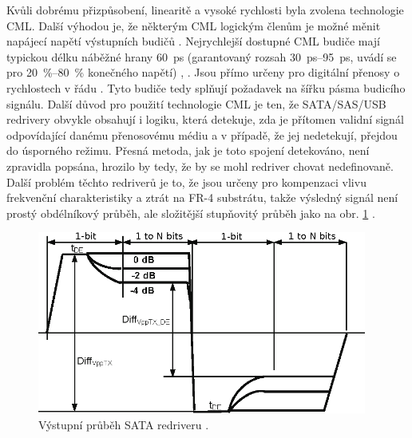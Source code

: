 Kvůli dobrému přizpůsobení, linearitě a vysoké rychlosti byla zvolena technologie \acrshort{CML}. Další výhodou je, že některým \acrshort{CML} logickým členům je možné měnit napájecí napětí výstupních budičů \cite{SY54020datasheet}. Nejrychlejší dostupné \acrshort{CML} budiče mají typickou délku náběžné hrany \SI{60}{\pico\second} (garantovaný rozsah \mbox{\SIrange{30}{95}{\ps}}, uvádí se pro \mbox{\SIrange{20}{80}{\%}} konečného napětí) \cite{SY54020datasheet}, \cite{SY54017datasheet}. Jsou přímo určeny pro digitální přenosy o rychlostech v řádu \si{\gigabitpersecond}. Tyto budiče tedy splňují požadavek na šířku pásma budicího signálu.
Další důvod pro použití technologie \acrshort{CML} je ten, že \acrshort{SATA}/\acrshort{SAS}/\acrshort{USB} redrivery obvykle obsahují i logiku, která detekuje, zda je přítomen validní signál odpovídající danému přenosovému médiu a v případě, že jej nedetekují, přejdou do úsporného režimu. Přesná metoda, jak je toto spojení detekováno, není zpravidla popsána, hrozilo by tedy, že by se mohl redriver chovat nedefinovaně. Další problém těchto redriverů je to, že jsou určeny pro kompenzaci vlivu frekvenční charakteristiky a ztrát na FR-4 substrátu, takže výsledný signál není prostý obdélníkový průběh, ale složitější stupňovitý průběh jako na obr. \ref{redriver} \cite{SN75LVCP601datasheet}.

		\begin{figure}[H]\includegraphics[width=\textwidth,height=6cm,keepaspectratio]{images/redriver.eps}\caption{Výstupní průběh \acrshort{SATA} redriveru \cite{SN75LVCP601datasheet}.}\label{redriver}\end{figure}		
